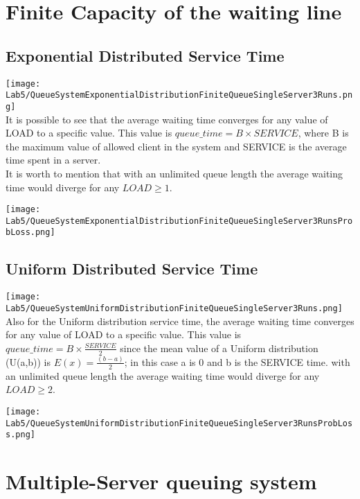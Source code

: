 \documentclass[twocolumn,letterpaper]{report}
\begin{document}
{						
						
	\section{Finite Capacity of the waiting line}
	 			\subsection{Exponential Distributed Service Time}
	 						\texttt{[image: Lab5/QueueSystemExponentialDistributionFiniteQueueSingleServer3Runs.png]} \\
It is possible to see that the average waiting time converges for any value of LOAD to a specific value. This value is $queue\_time = B \times SERVICE$, where B is the maximum value of allowed client in the system and SERVICE is the average time spent in a server. \\
It is worth to mention that with an unlimited queue length the average waiting time would diverge for any $LOAD \ge 1$.

	 					\texttt{[image: Lab5/QueueSystemExponentialDistributionFiniteQueueSingleServer3RunsProbLoss.png]} \\
	 					
	 					
	 			\subsection{Uniform Distributed Service Time}
	 			\texttt{[image: Lab5/QueueSystemUniformDistributionFiniteQueueSingleServer3Runs.png]} \\
	 			Also for the Uniform distribution service time, the average waiting time converges for any value of LOAD to a specific value. This value is $queue\_time = B \times\frac{SERVICE}{2}$ since the mean value of a Uniform distribution (U(a,b)) is $E(x)=\frac{(b-a)}{2}$; in this case a is 0 and b is the SERVICE time. with an unlimited queue length the average waiting time would diverge for any $LOAD \ge 2$.
	 			
	 		\texttt{[image: Lab5/QueueSystemUniformDistributionFiniteQueueSingleServer3RunsProbLoss.png]} \\
	 			
	 			
	 			
	 			\section{Multiple-Server queuing system}
}
\end{document}
